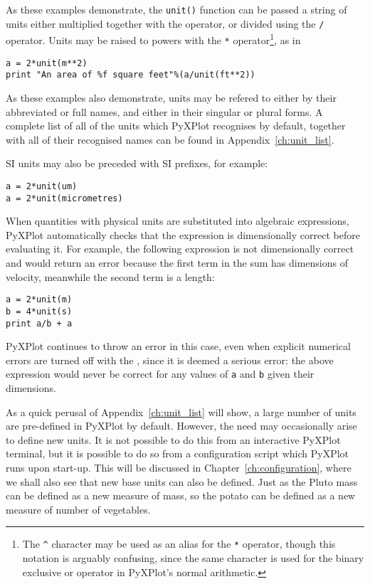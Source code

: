 \noindent As these examples demonstrate, the {\tt unit()} function can be
passed a string of units either multiplied together with the {\tt *} operator,
or divided using the {\tt /} operator. Units may be raised to powers with the
{\tt **} operator\footnote{The {\tt \^{}} character may be used as an alias for
the {\tt **} operator, though this notation is arguably confusing, since the
same character is used for the binary exclusive or operator in PyXPlot's normal
arithmetic.}, as in

\begin{verbatim}
a = 2*unit(m**2)
print "An area of %f square feet"%(a/unit(ft**2))
\end{verbatim}

\noindent As these examples also demonstrate, units may be refered to either by
their abbreviated or full names, and either in their singular or plural forms.
A complete list of all of the units which PyXPlot recognises by default,
together with all of their recognised names can be found in
Appendix~\ref{ch:unit_list}.

SI units may also be preceded with SI prefixes, for
example:

\begin{verbatim}
a = 2*unit(um)
a = 2*unit(micrometres)
\end{verbatim}

When quantities with physical units are substituted into algebraic expressions,
PyXPlot automatically checks that the expression is dimensionally correct
before evaluating it. For example, the following expression is not
dimensionally correct and would return an error because the first term in the
sum has dimensions of velocity, meanwhile the second term is a length:

\begin{verbatim}
a = 2*unit(m)
b = 4*unit(s)
print a/b + a
\end{verbatim}

\noindent PyXPlot continues to throw an error in this case, even when explicit
numerical errors are turned off with the ,
since it is deemed a serious error: the above expression would never be correct
for any values of {\tt a} and {\tt b} given their dimensions.

As a quick perusal of Appendix~\ref{ch:unit_list} will show, a large number of
units are pre-defined in PyXPlot by default. However, the need may occasionally
arise to define new units. It is not possible to do this from an interactive
PyXPlot terminal, but it is possible to do so from a configuration script which
PyXPlot runs upon start-up. This will be discussed in
Chapter~\ref{ch:configuration}, where we shall also see that new base units can
also be defined. Just as the Pluto mass can be defined as a new measure of
mass, so the potato can be defined as a new measure of number of vegetables.

